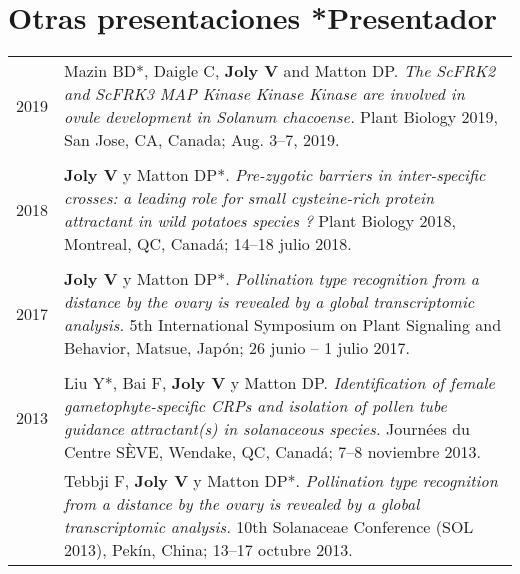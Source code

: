 \documentclass[letterpaper,12pt]{article}
\begin{document}
\vspace{6mm}

\section[Otras presentaciones]{Otras presentaciones \hfill \small{*Presentador}}

\begin{tabularx}{\textwidth}{@{}r|X@{}}

2019
& Mazin BD*, Daigle C, \textbf{Joly V} and Matton DP.
  \emph{The ScFRK2 and ScFRK3 MAP Kinase Kinase Kinase are involved in ovule
  development in \emph{Solanum chacoense}.}
  Plant Biology 2019, San Jose, CA, Canada;
  Aug. 3--7, 2019.
  \\

\multicolumn{2}{c}{} \\

2018
& \textbf{Joly V} y Matton DP*.
  \emph{Pre-zygotic barriers in inter-specific crosses: a leading role for small
  cysteine-rich protein attractant in wild potatoes species ?}
  Plant Biology 2018, Montreal, QC, Canadá;
  14–18 julio 2018.
  \\

\multicolumn{2}{c}{} \\

2017
& \textbf{Joly V} y Matton DP*.
  \emph{Pollination type recognition from a distance by the ovary is revealed
  by a global transcriptomic analysis.}
  5th International Symposium on Plant Signaling and Behavior, Matsue, Japón;
  26 junio – 1 julio 2017.
  \\

\multicolumn{2}{c}{} \\

2013
& Liu Y*, Bai F, \textbf{Joly V} y Matton DP.
  \emph{Identification of female gametophyte-specific CRPs and isolation of
  pollen tube guidance attractant(s) in solanaceous species.}
  Journées du Centre SÈVE, Wendake, QC, Canadá;
  7–8 noviembre 2013.
  \vspace{1.5mm}
  \\

& Tebbji F, \textbf{Joly V} y Matton DP*. \emph{Pollination type recognition
  from a distance by the ovary is revealed by a global transcriptomic analysis.}
  10th Solanaceae Conference (SOL 2013), Pekín, China;
  13–17 octubre 2013.
  \vspace{1.5mm}
  \\


\end{tabularx}
\end{document}
